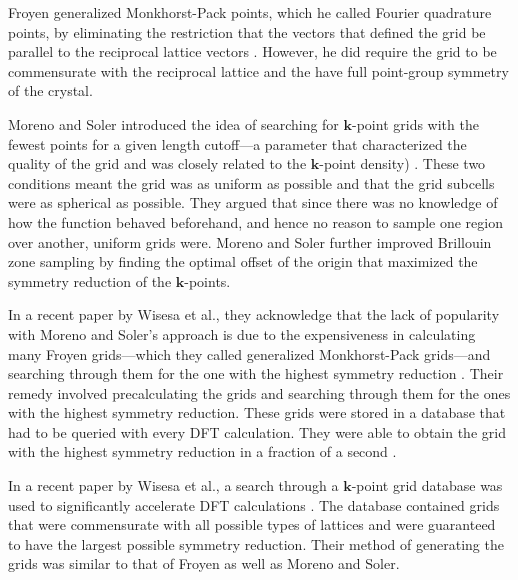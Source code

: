 \documentclass[ reprint,
 amsmath,amssymb, aps,
prb,
showpacs ]{revtex4-1}
\begin{document}
Froyen generalized Monkhorst-Pack points, which he called Fourier
quadrature points, by eliminating the restriction that the vectors
that defined the grid be parallel to the reciprocal lattice vectors
\cite{froyen1989brillouin}. However, he did require the grid to be
commensurate with the reciprocal lattice and the have full point-group
symmetry of the crystal.

Moreno and Soler introduced the idea of searching for
$\mathbf{k}$-point grids with the fewest points for a given length
cutoff---a parameter that characterized the quality of the grid and
was closely related to the $\mathbf{k}$-point density)
\cite{moreno1992optimal}. These two conditions meant the grid was as
uniform as possible and that the grid subcells were as spherical as
possible. They argued that since there was no knowledge of how the
function behaved beforehand, and hence no reason to sample one region
over another, uniform grids were. Moreno and Soler further improved
Brillouin zone sampling by finding the optimal offset of the origin
that maximized the symmetry reduction of the $\mathbf{k}$-points.

In a recent paper by Wisesa et al., they acknowledge that the lack of
popularity with Moreno and Soler's approach is due to the
expensiveness in calculating many Froyen grids---which they called
generalized Monkhorst-Pack grids---and searching through them for the
one with the highest symmetry reduction
\cite{wisesa2016efficient}. Their remedy involved precalculating the
grids and searching through them for the ones with the highest
symmetry reduction. These grids were stored in a database that had to
be queried with every DFT calculation. They were able to obtain the
grid with the highest symmetry reduction in a fraction of a second
\cite{mueller2016tool}.

In a recent paper by Wisesa et al., a search through a
$\mathbf{k}$-point grid database was used to significantly accelerate
DFT calculations \cite{wisesa2016efficient}. The database contained
grids that were commensurate with all possible types of lattices and
were guaranteed to have the largest possible symmetry reduction. Their
method of generating the grids was similar to that of Froyen as well
as Moreno and Soler.

{} 
\end{document}
